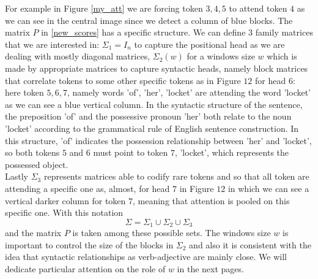 \documentclass[11pt]{article}
\theoremstyle{plain}
\theoremstyle{remark}
\theoremstyle{definition}
\theoremstyle{plain}
\theoremstyle{plain}
\begin{document}
For example in Figure \ref{my_att} we are forcing token $3,4,5$ to attend token $4$ as we can see in the central image since we detect a column of blue blocks. The matrix $P$ in \eqref{new_scores} has a specific structure. We can define $3$ family matrices that we are interested in: $\Sigma_1=I_n$ to capture the positional head as we are dealing with mostly diagonal matrices, $\Sigma_2(w)$ for a windows size $w$ which is made by appropriate matrices to capture syntactic heads, namely block matrices that correlate tokens to some other specific tokens as in Figure $12$ for head $6$: here token $5,6,7$, namely words 'of', 'her', 'locket' are attending the word 'locket' as we can see a blue vertical column. In the syntactic structure of the sentence, the preposition 'of' and the possessive pronoun 'her' both relate to the noun 'locket' according to the grammatical rule of English sentence construction. In this structure, 'of' indicates the possession relationship between 'her' and 'locket', so both tokens $5$ and $6$ must point to token $7$, 'locket', which represents the possessed object. \\
Lastly $\Sigma_3$ represents matrices able to codify rare tokens and so that all token are attending a specific one as, almost, for head $7$ in Figure $12$ in which we can see a vertical darker column for token $7$, meaning that attention is pooled on this specific one.
With this notation
\begin{equation} \label{perm_sets} 
    \Sigma= \Sigma_1 \cup \Sigma_2 \cup \Sigma_3
\end{equation}
and the matrix $P$ is taken among these possible sets. The windows size $w$ is important to control the size of the blocks in $\Sigma_2$ and also it is consistent with the idea that syntactic relationships as verb-adjective are mainly close. We will dedicate particular attention on the role of $w$ in the next pages. 
\end{document}
